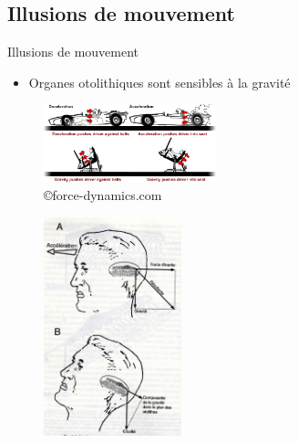 \subsection{Illusions de mouvement}
\begin{frame}{Illusions de mouvement}
\begin{multicols}{2}
\begin{itemize}
\item Organes otolithiques sont sensibles à la gravité
\end{itemize}
\begin{figure}
\centering
\includegraphics[width=5cm]{images/simulateurMovement}
\caption{\copyright force-dynamics.com}
\end{figure}
\begin{figure}
\centering
\includegraphics[width=4cm]{images/Berthoz001}
\caption{\cite{Berthoz1997}}
\end{figure}
\end{multicols}
\end{frame}

